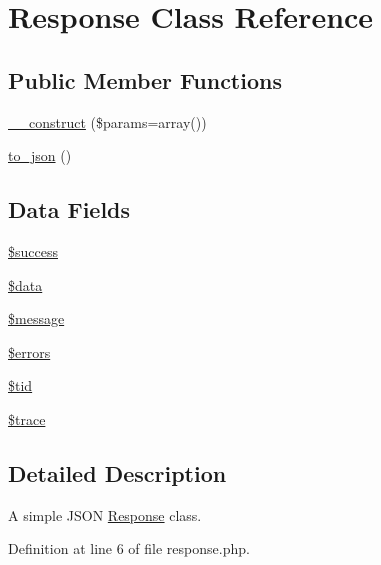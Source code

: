 \hypertarget{class_response}{\section{\-Response \-Class \-Reference}
\label{class_response}
}
\subsection*{\-Public \-Member \-Functions}
\begin{DoxyCompactItemize}
\item 
\hyperlink{class_response_a568ecdb0d73d2a870f33189739922a50}{\-\_\-\-\_\-construct} (\$params=array())
\item 
\hyperlink{class_response_a9371ec67835e9ae1d26f66c20e0a3192}{to\-\_\-json} ()
\end{DoxyCompactItemize}
\subsection*{\-Data \-Fields}
\begin{DoxyCompactItemize}
\item 
\hyperlink{class_response_a944564ee11ad329573548875b62a269e}{\$success}
\item 
\hyperlink{class_response_a6efc15b5a2314dd4b5aaa556a375c6d6}{\$data}
\item 
\hyperlink{class_response_abf17cb2dba2ed17cb28aa5f37deb5293}{\$message}
\item 
\hyperlink{class_response_ab24faf4aa647cdcee494fc48524ad4ff}{\$errors}
\item 
\hyperlink{class_response_a4450bdc73ff7cfb495cb4ec69c98fce8}{\$tid}
\item 
\hyperlink{class_response_a6983ad0ef833074b1af98e16d68ff4db}{\$trace}
\end{DoxyCompactItemize}


\subsection{\-Detailed \-Description}
\-A simple \-J\-S\-O\-N \hyperlink{class_response}{\-Response} class. 

\-Definition at line 6 of file response.\-php.



